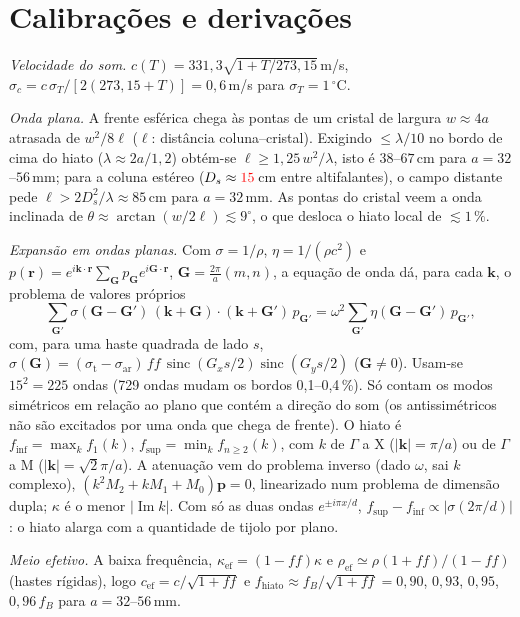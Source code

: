 \documentclass[10pt,twocolumn,a4paper]{article}
\newcommand{\confirmar}[1]{\textcolor{red}{#1}}   %
\newcommand{\finf}{f_\text{inf}}
\newcommand{\fsup}{f_\text{sup}}
\begin{document}
\section{Calibrações e derivações}
\emph{Velocidade do som.} $c(T)=331{,}3\sqrt{1+T/273{,}15}$\,m/s, $\sigma_c=c\,\sigma_T/[2(273{,}15+T)]=0{,}6$\,m/s
para $\sigma_T=1\,^\circ$C.

\emph{Onda plana.} A frente esférica chega às pontas de um cristal de largura $w\approx4a$ atrasada de
$w^2/8\ell$ ($\ell$: distância coluna--cristal). Exigindo $\le\lambda/10$ no bordo de cima do hiato
($\lambda\approx2a/1{,}2$) obtém-se $\ell\ge1{,}25\,w^2/\lambda$, isto é $38$--$67$\,cm para $a=32$--$56$\,mm;
para a coluna estéreo ($D_s\approx\confirmar{15}$\,cm entre altifalantes), o campo distante pede
$\ell>2D_s^2/\lambda\approx85$\,cm para $a=32$\,mm. As pontas do cristal veem a onda inclinada de
$\theta\approx\arctan(w/2\ell)\lesssim9^\circ$, o que desloca o hiato local de ${\lesssim}1\,\%$.

\emph{Expansão em ondas planas.} Com $\sigma=1/\rho$, $\eta=1/(\rho c^2)$ e
$p(\mathbf r)=e^{i\mathbf k\cdot\mathbf r}\sum_{\mathbf G}p_{\mathbf G}e^{i\mathbf G\cdot\mathbf r}$,
$\mathbf G=\tfrac{2\pi}{a}(m,n)$, a equação de onda dá, para cada $\mathbf k$, o problema de valores próprios
\begin{equation*}
  \sum_{\mathbf G'}\sigma(\mathbf G-\mathbf G')\,(\mathbf k+\mathbf G)\cdot(\mathbf k+\mathbf G')\,p_{\mathbf G'}
  =\omega^2\sum_{\mathbf G'}\eta(\mathbf G-\mathbf G')\,p_{\mathbf G'},
\end{equation*}
com, para uma haste quadrada de lado $s$,
$\sigma(\mathbf G)=(\sigma_\text{t}-\sigma_\text{ar})\,f\!f\,\operatorname{sinc}(G_xs/2)\operatorname{sinc}(G_ys/2)$
($\mathbf G\neq0$). Usam-se $15^2=225$ ondas (729 ondas mudam os bordos 0,1--0,4\,\%). Só contam os modos
simétricos em relação ao plano que contém a direção do som (os antissimétricos não são excitados por
uma onda que chega de frente). O hiato é $\finf=\max_k f_1(k)$, $\fsup=\min_k f_{n\ge2}(k)$, com $k$ de
$\Gamma$ a X ($|\mathbf k|=\pi/a$) ou de $\Gamma$ a M ($|\mathbf k|=\sqrt2\pi/a$). A atenuação vem do
problema inverso (dado $\omega$, sai $k$ complexo), $(k^2M_2+kM_1+M_0)\mathbf p=0$, linearizado num problema
de dimensão dupla; $\kappa$ é o menor $|\operatorname{Im}k|$. Com só as duas ondas $e^{\pm i\pi x/d}$,
$\fsup-\finf\propto|\sigma(2\pi/d)|$: o hiato alarga com a quantidade de tijolo por plano.

\emph{Meio efetivo.} A baixa frequência, $\kappa_\text{ef}=(1-f\!f)\kappa$ e
$\rho_\text{ef}\simeq\rho(1+f\!f)/(1-f\!f)$ (hastes rígidas), logo $c_\text{ef}=c/\sqrt{1+f\!f}$ e
$f_\text{hiato}\approx f_B/\sqrt{1+f\!f}=0{,}90$, $0{,}93$, $0{,}95$, $0{,}96\,f_B$ para $a=32$--$56$\,mm.
\end{document}
